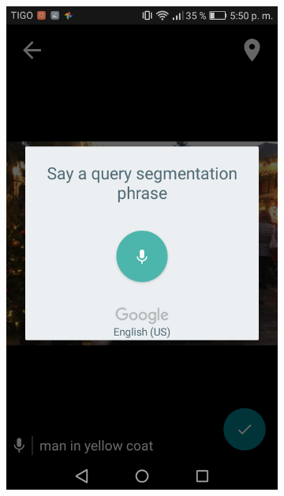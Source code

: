 \begin{figure}[!htbp]
\begin{multicols}{3}
\begin{subfigure}[b]{\columnwidth}
    \label{subfig:image_pre}
    \end{subfigure}
    
    \begin{subfigure}[b]{\columnwidth}
            \centering
            \includegraphics[width=\textwidth]{./figures/dmn_app/views/4.png}
    \label{subfig:mic_input}
    \end{subfigure}
    

\end{multicols}
\end{figure}
